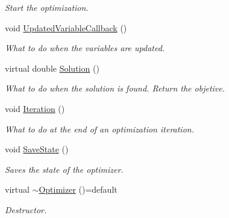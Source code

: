 \begin{DoxyCompactItemize}
\begin{DoxyCompactList}\small\item\em Start the optimization. \end{DoxyCompactList}\item 
\hypertarget{classop_1_1Optimizer_a5da854fdf2fcffdd23306eb217bfda72}{void \hyperlink{classop_1_1Optimizer_a5da854fdf2fcffdd23306eb217bfda72}{Updated\-Variable\-Callback} ()}\label{classop_1_1Optimizer_a5da854fdf2fcffdd23306eb217bfda72}

\begin{DoxyCompactList}\small\item\em What to do when the variables are updated. \end{DoxyCompactList}\item 
\hypertarget{classop_1_1Optimizer_a01eaee3352a45aed066cc20a0bb350fa}{virtual double \hyperlink{classop_1_1Optimizer_a01eaee3352a45aed066cc20a0bb350fa}{Solution} ()}\label{classop_1_1Optimizer_a01eaee3352a45aed066cc20a0bb350fa}

\begin{DoxyCompactList}\small\item\em What to do when the solution is found. Return the objetive. \end{DoxyCompactList}\item 
\hypertarget{classop_1_1Optimizer_ad0fd6a7a4d8e9ca7fa4bc19e4324398a}{void \hyperlink{classop_1_1Optimizer_ad0fd6a7a4d8e9ca7fa4bc19e4324398a}{Iteration} ()}\label{classop_1_1Optimizer_ad0fd6a7a4d8e9ca7fa4bc19e4324398a}

\begin{DoxyCompactList}\small\item\em What to do at the end of an optimization iteration. \end{DoxyCompactList}\item 
\hypertarget{classop_1_1Optimizer_a0895f1f34e3ed2be29c353b8c3af81c3}{void \hyperlink{classop_1_1Optimizer_a0895f1f34e3ed2be29c353b8c3af81c3}{Save\-State} ()}\label{classop_1_1Optimizer_a0895f1f34e3ed2be29c353b8c3af81c3}

\begin{DoxyCompactList}\small\item\em Saves the state of the optimizer. \end{DoxyCompactList}\item 
\hypertarget{classop_1_1Optimizer_a64e00a7291d7b7e4c394c2278f1b406b}{virtual \hyperlink{classop_1_1Optimizer_a64e00a7291d7b7e4c394c2278f1b406b}{$\sim$\-Optimizer} ()=default}\label{classop_1_1Optimizer_a64e00a7291d7b7e4c394c2278f1b406b}

\begin{DoxyCompactList}\small\item\em Destructor. \end{DoxyCompactList}\end{DoxyCompactItemize}
